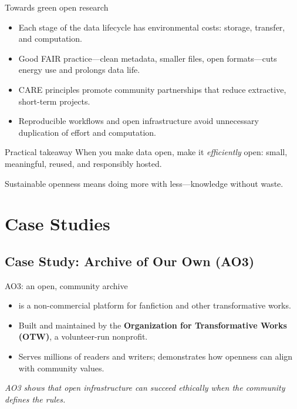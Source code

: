 \documentclass[aspectratio=169]{beamer}
\begin{document}
\begin{frame}{Towards green open research}
\begin{itemize}
  \item Each stage of the data lifecycle has environmental costs: storage, transfer, and computation.  
  \item Good FAIR practice—clean metadata, smaller files, open formats—cuts energy use and prolongs data life.  
  \item CARE principles promote community partnerships that reduce extractive, short-term projects.  
  \item Reproducible workflows and open infrastructure avoid unnecessary duplication of effort and computation.
\end{itemize}
\begin{exampleblock}{Practical takeaway}
When you make data open, make it \emph{efficiently} open: small, meaningful, reused, and responsibly hosted.
\end{exampleblock}
Sustainable openness means doing more with less—knowledge without waste.
\end{frame}

\section{Case Studies}

\subsection{Case Study: Archive of Our Own (AO3)}

\begin{frame}{AO3: an open, community archive}
\begin{itemize}
  \item \href{https://archiveofourown.org/}{} is a non-commercial platform for fanfiction and other transformative works.  
  \item Built and maintained by the \textbf{Organization for Transformative Works (OTW)}, a volunteer-run nonprofit.  
  \item Serves millions of readers and writers; demonstrates how openness can align with community values.
\end{itemize}
\medskip
\textit{AO3 shows that open infrastructure can succeed ethically when the community defines the rules.}
\end{frame}
\end{document}
